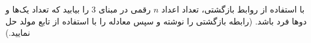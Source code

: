     \p 
با استفاده از روابط بازگشتی، تعداد اعداد
$n$
رقمی در مبنای
$3$
را بیابید که تعداد یک‌ها و دوها فرد باشد. (رابطه بازگشتی را نوشته و سپس معادله را با استفاده از تابع مولد حل نمایید.)